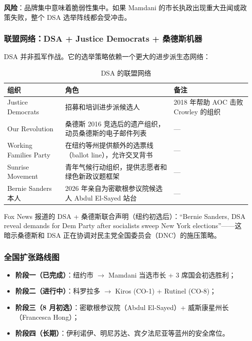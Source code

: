 \documentclass[12pt,a4paper]{ctexart}
\begin{document}
\textbf{风险}：品牌集中意味着脆弱性集中。如果 Mamdani 的市长执政出现重大丑闻或政策失败，整个 DSA 选举阵线都会受冲击。

\subsubsection{联盟网络：DSA + Justice Democrats + 桑德斯机器}

DSA 并非孤军作战。它的选举策略依赖一个更大的进步派生态网络：

\begin{table}[h]
\centering
\caption{DSA 的联盟网络}
\begin{tabular}{@{}lp{5.2cm}p{8cm}@{}}
\toprule
\textbf{组织} & \textbf{角色} & \textbf{备注} \\
\midrule
Justice Democrats & 招募和培训进步派候选人 & 2018 年帮助 AOC 击败 Crowley 的组织 \\
Our Revolution & 桑德斯 2016 竞选后的遗产组织，动员桑德斯的电子邮件列表 & --- \\
Working Families Party & 在纽约等州提供额外的选票线（ballot line），允许交叉背书 & --- \\
Sunrise Movement & 青年气候行动组织，提供志愿者和绿色新政议题框架 & --- \\
Bernie Sanders 本人 & 2026 年亲自为密歇根参议院候选人 Abdul El-Sayed 站台 & --- \\
\bottomrule
\end{tabular}
\end{table}

Fox News 报道的 DSA + 桑德斯联合声明（纽约初选后）：``Bernie Sanders, DSA reveal demands for Dem Party after socialists sweep New York elections''——这暗示桑德斯和 DSA 正在协调对民主党全国委员会（DNC）的施压策略。

\subsubsection{全国扩张路线图}

\begin{itemize}
  \item \textbf{阶段一（已完成）}：纽约市 $\rightarrow$ Mamdani 当选市长 + 3 席国会初选胜利；
  \item \textbf{阶段二（进行中）}：科罗拉多 $\rightarrow$ Kiros (CO-1) + Rutinel (CO-8)；
  \item \textbf{阶段三（8 月初选）}：密歇根参议院（Abdul El-Sayed）+ 威斯康星州长（Francesca Hong）；
  \item \textbf{阶段四（长期）}：伊利诺伊、明尼苏达、宾夕法尼亚等蓝州的安全席位。
\end{itemize}
\end{document}
